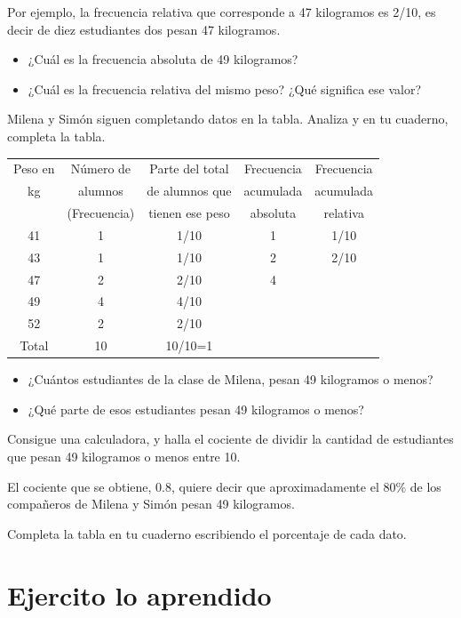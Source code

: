 \documentclass[10pt,twoside]{article}
\begin{document}
Por ejemplo, la frecuencia relativa que corresponde a 47 kilogramos es 2/10, es decir de diez estudiantes dos pesan 47 kilogramos.
\begin{itemize}
\item ¿Cuál es la frecuencia absoluta de 49 kilogramos?
\item ¿Cuál es la frecuencia relativa del mismo peso? ¿Qué significa ese valor?
\end{itemize}
Milena y Simón siguen completando datos en la tabla.
Analiza y en tu cuaderno, completa la tabla.
\begin{center}
\begin{tabular}{|c|c|c|c|c|}
\hline 
Peso en & Número de & Parte del total & Frecuencia & Frecuencia \\ 
kg & alumnos & de alumnos que & acumulada & acumulada \\ 
 & (Frecuencia) & tienen ese peso & absoluta & relativa \\ 
\hline 
41 & 1 & 1/10 & 1 & 1/10 \\ 
\hline 
43 & 1 & 1/10 & 2 & 2/10 \\ 
\hline 
47 & 2 & 2/10 & 4 &  \\ 
\hline 
49 & 4 & 4/10 &  &  \\ 
\hline 
52 & 2 & 2/10 & & \\ \hline \hline
Total & 10 & 10/10=1 & & \\ \hline
\end{tabular} 
\end{center}
\begin{itemize}
\item ¿Cuántos estudiantes de la clase de Milena, pesan 49 kilogramos o menos?
\item ¿Qué parte de esos estudiantes pesan 49 kilogramos o menos?
\end{itemize}
Consigue una calculadora, y halla el cociente de dividir la cantidad de estudiantes que pesan 49 kilogramos o menos entre 10.

El cociente que se obtiene, 0.8, quiere decir que aproximadamente el 80\% de los compañeros de Milena y Simón pesan 49 kilogramos.

Completa la tabla en tu cuaderno escribiendo el porcentaje de cada dato.



\section*{Ejercito lo aprendido}
\end{document}
